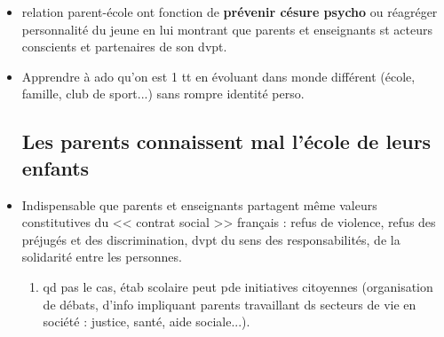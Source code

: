 \documentclass[12pt]{report}
\begin{document}
\begin{itemize}
\begin{itemize}
\item relation parent-école ont fonction de \textbf{prévenir césure psycho} ou réagréger personnalité du jeune en lui montrant que parents et enseignants st acteurs conscients et partenaires de son dvpt.\\

\item Apprendre à ado qu'on est 1 tt en évoluant dans monde différent (école, famille, club de sport...) sans rompre identité perso. \\


\vspace{0.5cm}

\subsection{Les parents connaissent mal l'école de leurs enfants}


\item Indispensable que parents et enseignants partagent même valeurs constitutives du << contrat social >> français : refus de violence, refus des préjugés et des discrimination, dvpt du sens des responsabilités, de la solidarité entre les personnes. \\
\begin{enumerate}
\item qd pas le cas, étab scolaire peut pde initiatives citoyennes (organisation de débats, d'info impliquant parents travaillant ds secteurs de vie en société : justice, santé, aide sociale...).
\end{enumerate}


\end{itemize}
\end{itemize}
\end{document}
